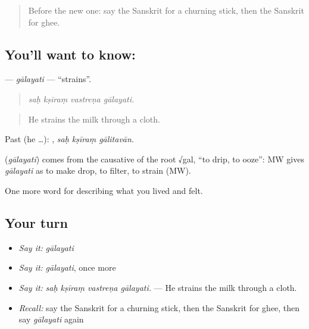 \begin{quote}
Before the new one: say the Sanskrit for a churning stick, then the Sanskrit for ghee.
\end{quote}

\subsection*{You'll want to know: }
\textbf{} — \emph{gālayati} — \textquotedblleft{}strains\textquotedblright{}.

\begin{quote}
   
\end{quote}

\begin{quote}
\emph{saḥ kṣīraṃ vastreṇa gālayati.}
\end{quote}

\begin{quote}
He strains the milk through a cloth.
\end{quote}

Past (he …):   , \emph{saḥ kṣīraṃ gālitavān}.

\begin{cousinweb}
\textbf{} (\emph{gālayati}) comes from the causative of the root √gal, \textquotedblleft{}to drip, to ooze\textquotedblright{}: MW gives \emph{gālayati} as to make drop, to filter, to strain (MW).
\end{cousinweb}

\begin{grammarlens}[title={What you've built}]
One more word for describing what you lived and felt.
\end{grammarlens}

\subsection*{Your turn}
\begin{itemize}
\raggedright
  \item \emph{Say it:} \emph{gālayati}
  \item \emph{Say it:} \emph{gālayati}, once more
  \item \emph{Say it:} \emph{saḥ kṣīraṃ vastreṇa gālayati.} — He strains the milk through a cloth.
  \item \emph{Recall:} say the Sanskrit for a churning stick, then the Sanskrit for ghee, then say \emph{gālayati} again
\end{itemize}

